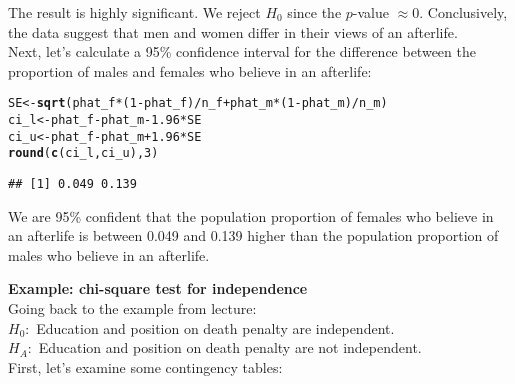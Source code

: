\documentclass[11pt]{article}\usepackage[]{graphicx}\usepackage[]{color}
\makeatletter
\newcommand{\hlnum}[1]{\textcolor[rgb]{0.686,0.059,0.569}{#1}}%
\newcommand{\hlopt}[1]{\textcolor[rgb]{0,0,0}{#1}}%
\newcommand{\hlstd}[1]{\textcolor[rgb]{0.345,0.345,0.345}{#1}}%
\newcommand{\hlkwb}[1]{\textcolor[rgb]{0.69,0.353,0.396}{#1}}%
\newcommand{\hlkwd}[1]{\textcolor[rgb]{0.737,0.353,0.396}{\textbf{#1}}}%
\newenvironment{kframe}{%
 \def\at@end@of@kframe{}%
 \ifinner\ifhmode%
  \def\at@end@of@kframe{\end{minipage}}%
  \begin{minipage}{\columnwidth}%
 \fi\fi%
 \def\FrameCommand##1{\hskip\@totalleftmargin \hskip-\fboxsep
 \colorbox{shadecolor}{##1}\hskip-\fboxsep
     \hskip-\linewidth \hskip-\@totalleftmargin \hskip\columnwidth}%
 \MakeFramed {\advance\hsize-\width
   \@totalleftmargin\z@ \linewidth\hsize
   \@setminipage}}%
 {\par\unskip\endMakeFramed%
 \at@end@of@kframe}
\newenvironment{knitrout}{}{} %
\makeatother
\begin{document}
The result is highly significant.  We reject $H_0$ since the $p$-value $\approx 0$.  Conclusively, the data suggest that men and women differ in their views of an afterlife.\\

Next, let's calculate a 95\% confidence interval for the difference between the proportion of males and females who believe in an afterlife:
\begin{knitrout}
\color{fgcolor}\begin{kframe}
\begin{alltt}
\hlstd{SE} \hlkwb{<-} \hlkwd{sqrt}\hlstd{(phat_f}\hlopt{*}\hlstd{(}\hlnum{1}\hlopt{-}\hlstd{phat_f)}\hlopt{/}\hlstd{n_f} \hlopt{+} \hlstd{phat_m}\hlopt{*}\hlstd{(}\hlnum{1}\hlopt{-}\hlstd{phat_m)}\hlopt{/}\hlstd{n_m)}
\hlstd{ci_l} \hlkwb{<-} \hlstd{phat_f} \hlopt{-} \hlstd{phat_m} \hlopt{-} \hlnum{1.96} \hlopt{*} \hlstd{SE}
\hlstd{ci_u} \hlkwb{<-} \hlstd{phat_f} \hlopt{-} \hlstd{phat_m} \hlopt{+} \hlnum{1.96} \hlopt{*} \hlstd{SE}
\hlkwd{round}\hlstd{(}\hlkwd{c}\hlstd{(ci_l, ci_u),} \hlnum{3}\hlstd{)}
\end{alltt}
\begin{verbatim}
## [1] 0.049 0.139
\end{verbatim}
\end{kframe}
\end{knitrout}
We are 95\% confident that the population proportion of females who believe in an afterlife is between 0.049 and 0.139 higher than the population proportion of males who believe in an afterlife.\\
\clearpage

\textbf{Example: chi-square test for independence}\\
Going back to the example from lecture:\\
$H_0:$ Education and position on death penalty are independent.\\
$H_A:$ Education and position on death penalty are not independent.\\

First, let's examine some contingency tables:
\end{document}
